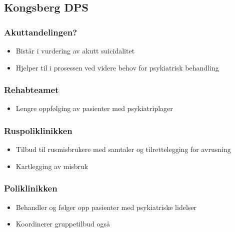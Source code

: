 \documentclass[11pt]{report} %
\begin{document}
                  \subsection{Kongsberg DPS}\label{sec:org_kdps}
                      \subsubsection{Akuttandelingen?}\label{sec:org_kdps_akutt}
                          \begin{itemize}
                            \item Bistår i vurdering av akutt suicidalitet\\
                            \item Hjelper til i prosessen ved videre behov for psykiatrisk behandling\\
                          \end{itemize} 
                        \subsubsection{Rehabteamet}\label{sec:org_kdps_rehabliltering}
                          \begin{itemize}
                            \item Lengre oppfølging av pasienter med psykiatriplager\\
                          \end{itemize}
                        \subsubsection{Ruspoliklinikken}\label{sec:org_kdps_ruspol}
                          \begin{itemize}
                            \item Tilbud til rusmisbrukere med samtaler og tilrettelegging for avrusning\\
                            \item Kartlegging av misbruk\\
                          \end{itemize}
                        \subsubsection{Poliklinikken}\label{sec:org_kdps_poli}
                          \begin{itemize}
                            \item Behandler og følger opp pasienter med psykiatriske lidelser\\
                            \item Koordinerer gruppetilbud også\\
                          \end{itemize}
\end{document}
